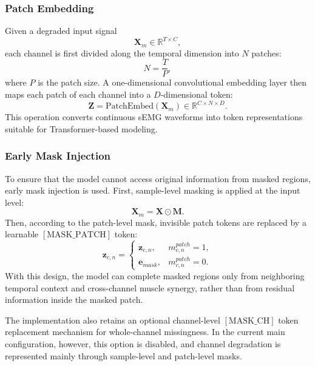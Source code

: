 \documentclass[journal]{IEEEtran}
\begin{document}
\subsubsection{Patch Embedding}
Given a degraded input signal
\begin{equation}
\mathbf{X}_{m} \in \mathbb{R}^{T \times C},
\end{equation}
each channel is first divided along the temporal dimension into $N$ patches:
\begin{equation}
N = \frac{T}{P},
\end{equation}
where $P$ is the patch size. A one-dimensional convolutional embedding layer then maps each patch of each channel into a $D$-dimensional token:
\begin{equation}
\mathbf{Z} = \mathrm{PatchEmbed}(\mathbf{X}_{m}) \in \mathbb{R}^{C \times N \times D}.
\end{equation}
This operation converts continuous sEMG waveforms into token representations suitable for Transformer-based modeling.

\subsubsection{Early Mask Injection}
To ensure that the model cannot access original information from masked regions, early mask injection is used. First, sample-level masking is applied at the input level:
\begin{equation}
\mathbf{X}_{m} = \mathbf{X} \odot \mathbf{M}.
\end{equation}
Then, according to the patch-level mask, invisible patch tokens are replaced by a learnable $[\mathrm{MASK\_PATCH}]$ token:
\begin{equation}
\mathbf{z}_{c,n} =
\begin{cases}
\mathbf{z}_{c,n}, & m^{patch}_{c,n}=1,\\
\mathbf{e}_{mask}, & m^{patch}_{c,n}=0.
\end{cases}
\end{equation}
With this design, the model can complete masked regions only from neighboring temporal context and cross-channel muscle synergy, rather than from residual information inside the masked patch.

The implementation also retains an optional channel-level $[\mathrm{MASK\_CH}]$ token replacement mechanism for whole-channel missingness. In the current main configuration, however, this option is disabled, and channel degradation is represented mainly through sample-level and patch-level masks.
\end{document}

